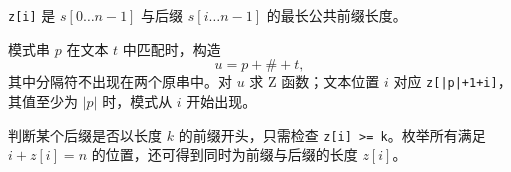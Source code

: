 \texttt{z[i]} 是 $s[0\ldots n-1]$ 与后缀 $s[i\ldots n-1]$ 的最长公共前缀长度。

模式串 $p$ 在文本 $t$ 中匹配时，构造
\[
  u=p+\# +t,
\]
其中分隔符不出现在两个原串中。对 $u$ 求 Z 函数；文本位置 $i$ 对应 \texttt{z[|p|+1+i]}，其值至少为 $|p|$ 时，模式从 $i$ 开始出现。

判断某个后缀是否以长度 $k$ 的前缀开头，只需检查 \texttt{z[i] >= k}。枚举所有满足 $i+z[i]=n$ 的位置，还可得到同时为前缀与后缀的长度 $z[i]$。
